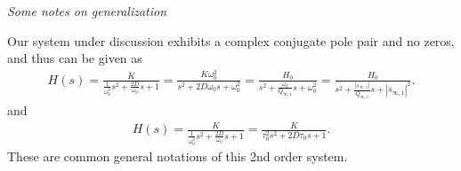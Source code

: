 \begin{mdframed}
\textit{Some notes on generalization}


Our system under discussion exhibits a complex conjugate pole pair and no zeros,
and thus can be given as
\begin{align}
H(s) =
\frac{K}{\frac{1}{\omega_0^2} s^2 + \frac{2 D}{\omega_0} s + 1}=
\frac{K \omega_0^2}{s^2 + 2 D \omega_0 s + \omega_0^2} =
\frac{H_0}{s^2 + \frac{\omega_0}{Q_{\infty,1}} s + \omega_0^2} =
\frac{H_0}{s^2 + \frac{|s_{\infty,1}|}{Q_{\infty,1}} s + |s_{\infty,1}|^2}.
\end{align}
and
\begin{align}
\label{eq:Hs_general}
H(s) = \frac{K}{\frac{1}{\omega_0^2} s^2 + \frac{2 D}{\omega_0} s + 1}
= \frac{K}{\tau_0^2 s^2 + 2 D \tau_0 s + 1}.
\end{align}
These are common general notations of this 2nd order system.


\end{mdframed}
